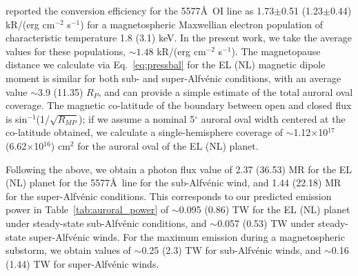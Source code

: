 \documentclass{emulateapj}
\begin{document}

\citet{Steele1990} reported the conversion efficiency for the 5577\AA\ OI line as 1.73$\pm$0.51 (1.23$\pm$0.44) kR/(erg cm$^{-2}$ s$^{-1}$) for a magnetospheric Maxwellian electron population of characteristic temperature 1.8 (3.1) keV. In the present work, we take the average values for these populations, ${\sim} 1.48$ kR/(erg cm$^{-2}$ s$^{-1}$). The magnetopause distance we calculate via Eq.~\ref{eq:pressbal} for the EL (NL) magnetic dipole moment is similar for both sub- and super-Alfv\'{e}nic conditions, with an average value $\sim$3.9 (11.35) $R_P$, and can provide a simple estimate of the total auroral oval coverage. The magnetic co-latitude of the boundary between open and closed flux is sin$^{-1}$(1/$\sqrt{R_{MP}}$); if we assume a nominal 5$^\circ$ auroral oval width centered at the co-latitude obtained, we calculate a single-hemisphere coverage of $\sim$1.12$\times$10$^{17}$ (6.62$\times$10$^{16}$) cm$^2$ for the auroral oval of 
the EL (NL) planet.


Following the above, we obtain a photon flux value of 2.37 (36.53) MR for the EL (NL) planet for the 5577\AA\ line for the sub-Alfv\'{e}nic wind, and 1.44 (22.18) MR for the super-Alfv\'{e}nic conditions. This corresponds to our predicted emission power in Table~\ref{tab:auroral_power} of $\sim$0.095 (0.86) TW for the EL (NL) planet under steady-state sub-Alfv\'{e}nic conditions, and $\sim$0.057 (0.53) TW under steady-state super-Alfv\'{e}nic winds. For the maximum emission during a magnetospheric substorm, we obtain values of $\sim$0.25 (2.3) TW for sub-Alfv\'{e}nic winds, and $\sim$0.16 (1.44) TW for super-Alfv\'{e}nic winds. 
 
\end{document}
